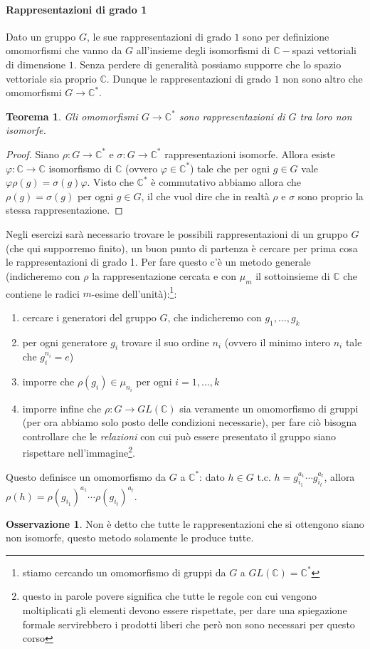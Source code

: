 \documentclass[11pt]{article}
\theoremstyle{plain}
\newtheorem{thm}{Teorema}[section]
\theoremstyle{definition}
\newtheorem*{rem}{Osservazione}
\theoremstyle{remark}
\newcommand{\C}{\mathbb{C}}
\begin{document}
\paragraph{Rappresentazioni di grado 1}
Dato un gruppo $G$, le sue rappresentazioni di grado $1$ sono per definizione
omomorfismi che vanno da $G$ all'insieme degli isomorfismi di $\C-$spazi vettoriali di dimensione $1$.
Senza perdere di generalità possiamo supporre che lo spazio vettoriale sia proprio $\C$. Dunque le
rappresentazioni di grado $1$ non sono altro che omomorfismi $G\to\C^*$.
\begin{thm}
Gli omomorfismi $G\to\C^*$ sono rappresentazioni di $G$ tra loro non isomorfe.
\end{thm}
\begin{proof}
Siano $\rho:G\to\C^*$ e $\sigma:G\to\C^*$ rappresentazioni isomorfe. Allora
esiste $\varphi:\C\to\C$ isomorfismo di $\C$ (ovvero $\varphi\in\C^*$) tale che per ogni $g\in G$ vale $\varphi \rho(g) = \sigma(g) \varphi$.
Visto che $\C^*$ è commutativo abbiamo allora che $\rho(g) = \sigma(g)$ per ogni $g\in G$, il che vuol dire che 
in realtà $\rho$ e $\sigma$ sono proprio la stessa rappresentazione.
\end{proof}

Negli esercizi sarà necessario trovare le possibili rappresentazioni di un gruppo $G$ (che qui supporremo finito), un buon punto di partenza è cercare per prima cosa le rappresentazioni di grado 1. Per fare questo c'è un metodo generale (indicheremo con $\rho$ la rappresentazione cercata e con $\mu_m$ il sottoinsieme di $\C$ che contiene le radici $m$-esime dell'unità):\footnote{stiamo cercando un omomorfismo di gruppi da $G$ a $GL(\C)=\C^*$}:
\begin{enumerate}
	\item cercare i generatori del gruppo $G$, che indicheremo con $g_1, \ldots, g_k$
	\item per ogni generatore $g_i$ trovare il suo ordine $n_i$ (ovvero il minimo intero $n_i$ tale che $g_i^{n_i}=e$)
	\item imporre che $\rho(g_i)\in \mu_{n_i}$ per ogni $i=1,\ldots,k$
	\item imporre infine che $\rho:G\to GL(\C)$ sia veramente un omomorfismo di gruppi (per ora abbiamo solo posto delle condizioni necessarie), per fare ciò bisogna controllare che le \textit{relazioni} con cui può essere presentato il gruppo siano rispettare nell'immagine\footnote{questo in parole povere significa che tutte le regole con cui vengono moltiplicati gli elementi devono essere rispettate, per dare una spiegazione formale servirebbero i prodotti liberi che però non sono necessari per questo corso}.
\end{enumerate}
Questo definisce un omomorfismo da $G$ a $\C^*$: dato $h\in G$ t.c. $h=g_{i_1}^{a_1}\cdots g_{i_t}^{a_t}$, allora $\rho(h) = \rho(g_{i_1})^{a_1}\cdots \rho(g_{i_t})^{a_t}$.
\begin{rem}
	Non è detto che tutte le rappresentazioni che si ottengono siano non isomorfe, questo metodo solamente le produce tutte.
\end{rem}
\end{document}
